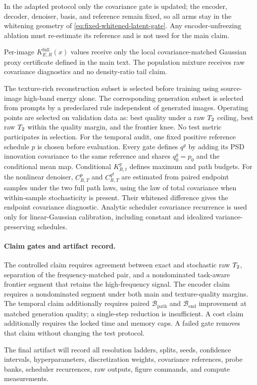 In the adapted protocol only the covariance gate is updated; the encoder,
decoder, denoiser, basis, and reference remain fixed, so
all arms stay in the whitening geometry of
\cref{eq:fixed-whitened-latent-gate}. Any encoder-unfreezing ablation must
re-estimate its reference and is not used for the main claim.

Per-image $K_{E,R}^{\mathrm{full}}(x)$ values receive only the local
covariance-matched Gaussian proxy certificate defined in the main text. The
population mixture receives raw covariance diagnostics and no density-ratio
tail claim.

The texture-rich reconstruction subset is selected before training using
source-image high-band energy alone. The corresponding generation subset is
selected from prompts by a predeclared rule independent of generated images.
Operating points are selected on validation data as: best quality under a raw
$T_2$ ceiling, best raw $T_2$ within the quality margin, and the frontier
knee. No test metric participates in selection. For the temporal audit, one
fixed positive reference schedule $p$ is chosen before evaluation. Every gate
defines $q^g$ by adding its PSD innovation covariance to the same reference and
shares $q^g_0=p_0$ and the conditional mean map. Conditional $K^g_{R,t}$
defines maximum and path budgets. For the nonlinear denoiser,
$C^p_{R,T}$ and $C^{q^g}_{R,T}$ are estimated from paired endpoint samples
under the two full path laws, using the law of total covariance when
within-sample stochasticity is present. Their whitened difference gives the
endpoint covariance diagnostic. Analytic scheduler covariance recurrence is
used only for linear-Gaussian calibration, including constant and idealized
variance-preserving schedules.

\paragraph{Claim gates and artifact record.}
The controlled claim requires agreement between exact and stochastic raw
$T_2$, separation of the frequency-matched pair, and a nondominated
task-aware frontier segment that retains the high-frequency signal. The encoder
claim requires a nondominated segment under both main and texture-quality
margins. The temporal claim additionally requires paired
$\mathcal B_{\mathrm{path}}$ and $\mathcal B_{\mathrm{end}}$ improvement at
matched generation quality; a single-step reduction is insufficient. A cost
claim additionally requires the locked time and memory caps. A failed gate
removes that claim without changing the test protocol.

The final artifact will record all resolution ladders, splits, seeds, confidence
intervals, hyperparameters, discretization weights, covariance references,
probe banks, scheduler recurrences, raw outputs, figure commands, and compute
measurements.
